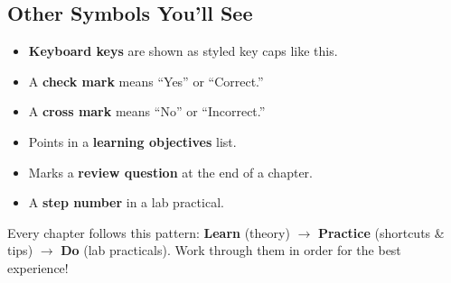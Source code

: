 \vspace{12pt}

\subsection*{Other Symbols You'll See}

\begin{itemize}[leftmargin=2cm, itemsep=6pt]
  \item[\key{Ctrl}] \textbf{Keyboard keys} are shown as styled key caps like this.
  \item[\textcolor{LabGreen}{\ding{51}}] A \textbf{check mark} means ``Yes'' or ``Correct.''
  \item[\textcolor{WarnRed}{\ding{55}}] A \textbf{cross mark} means ``No'' or ``Incorrect.''
  \item[\faAngleRight] Points in a \textbf{learning objectives} list.
  \item[\faQuestionCircle] Marks a \textbf{review question} at the end of a chapter.
  \item[\stepcircle{1}] A \textbf{step number} in a lab practical.
\end{itemize}

\vspace{10pt}

\begin{notebox}
Every chapter follows this pattern: \textbf{Learn} (theory) $\rightarrow$ \textbf{Practice} (shortcuts \& tips) $\rightarrow$ \textbf{Do} (lab practicals). Work through them in order for the best experience!
\end{notebox}

\vspace{6pt}

